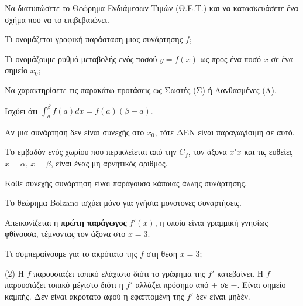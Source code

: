 \documentclass[11pt,a4paper]{article}
\newcommand{\kerkissans}[1]{{\fontfamily{maksf}\selectfont \textbf{#1}}}
\renewcommand{\textdexiakeraia}{}
\newcommand{\dint}{\displaystyle\int}
\newcommand\themanum{A}
\newcounter{thema}[section]
\renewcommand{\thethema}{\arabic{thema}}
\newcommand{\Thema}{\refstepcounter{thema}{\textbf{\textcolor{black}{\faPenSquare\ \  \large \kerkissans{\textbf{\thethemaο\hspace{2mm}Διαγώνισμα - Θέμα \themanum}}}}}\hspace{0mm}}{}
\newenvironment{thema}[1]
{\begin{tcolorbox}[title=\Thema\kerkissans{\textbf{\large{  #1}}},breakable,
enhanced standard,titlerule=0pt,toprule=0pt, rightrule=0pt, bottomrule=0pt,
colback=white,left=0mm,top=1mm,bottom=0mm,
boxrule=0pt,
colframe=white,leftrule=0mm,sharp corners,coltitle=black]
\renewcommand{\themanum}{#1}}
{\end{tcolorbox}}
\newcommand{\eng}[1]{\selectlanguage{english}#1\selectlanguage{greek}}
\begin{document}
\begin{thema}{A}
\begin{erwthma}
    \item Να διατυπώσετε το Θεώρημα Ενδιάμεσων Τιμών (Θ.Ε.Τ.) και να κατασκευάσετε ένα σχήμα που να το επιβεβαιώνει.
    \item Τι ονομάζεται γραφική παράσταση μιας συνάρτησης $f$;
    \item Τι ονομάζουμε ρυθμό μεταβολής ενός ποσού $y=f(x)$ ως προς ένα ποσό $x$ σε ένα σημείο $x_0$;
    \item Να χαρακτηρίσετε τις παρακάτω προτάσεις ως Σωστές (Σ) ή Λανθασμένες (Λ).
    \begin{alist}
        \item Ισχύει ότι $\dint_{a}^{\beta} f(a) dx = f(a)(\beta - a)$.
        \item Αν μια συνάρτηση δεν είναι συνεχής στο $x_0$, τότε ΔΕΝ είναι παραγωγίσιμη σε αυτό.
        \item Το εμβαδόν ενός χωρίου που περικλείεται από την $C_f$, τον άξονα $x'x$ και τις ευθείες $x=\alpha$, $x=\beta$, είναι ένας μη αρνητικός αριθμός.
        \item Κάθε συνεχής συνάρτηση είναι παράγουσα κάποιας άλλης συνάρτησης.
        \item Το θεώρημα \eng{Bolzano} ισχύει μόνο για γνήσια μονότονες συναρτήσεις.
    \end{alist}
    \item Απεικονίζεται η \textbf{πρώτη παράγωγος} $f'(x)$, η οποία είναι γραμμική γνησίως φθίνουσα, τέμνοντας τον άξονα στο $x=3$.
    \begin{center}
    \end{center}
    Τι συμπεραίνουμε για το ακρότατο της $f$ στη θέση $x=3$;
    \begin{tasks}[label=\let\textdexiakeraia\relax\alph*.](2)
        \task H $f$ παρουσιάζει τοπικό ελάχιστο διότι το γράφημα της $f'$ κατεβαίνει.
        \task H $f$ παρουσιάζει τοπικό μέγιστο διότι η $f'$ αλλάζει πρόσημο από $+$ σε $-$.
        \task Είναι σημείο καμπής.
        \task Δεν είναι ακρότατο αφού η εφαπτομένη της $f'$ δεν είναι μηδέν.
    \end{tasks}
\end{erwthma}
\end{thema}
\vspace{1cm}
\end{document}
